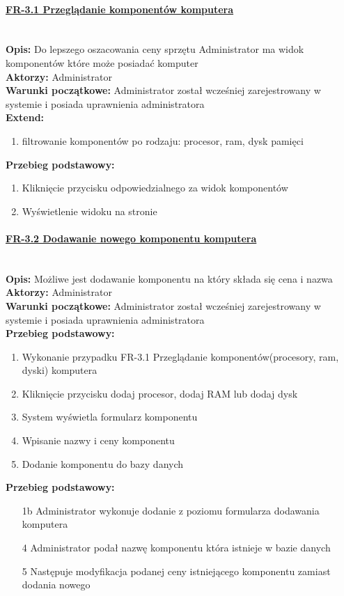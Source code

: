 \paragraph{\underline{FR-3.1 Przeglądanie komponentów komputera}}\mbox{}\\[1mm]
	\noindent\textbf{Opis:} Do lepszego oszacowania ceny sprzętu Administrator ma widok komponentów które może posiadać komputer\\
	\noindent\textbf{Aktorzy:} Administrator\\
	\textbf{Warunki początkowe:} Administrator został wcześniej zarejestrowany w systemie i posiada uprawnienia administratora\\
	\textbf{Extend:}
    \begin{enumerate}[noparskip]
		\item filtrowanie komponentów po rodzaju: procesor, ram, dysk pamięci
	\end{enumerate}
    \textbf{Przebieg podstawowy:}
	\begin{enumerate}[noparskip]
		\item Kliknięcie przycisku odpowiedzialnego za widok komponentów
		\item Wyświetlenie widoku na stronie
    \end{enumerate}

\paragraph{\underline{FR-3.2 Dodawanie nowego komponentu komputera}}\mbox{}\\[1mm]
	\noindent\textbf{Opis:} Możliwe jest dodawanie komponentu na który składa się cena i nazwa\\
	\noindent\textbf{Aktorzy:} Administrator\\
	\textbf{Warunki początkowe:} Administrator został wcześniej zarejestrowany w systemie i posiada uprawnienia administratora\\
    \textbf{Przebieg podstawowy:}
    \begin{enumerate}[noparskip]
		\item Wykonanie przypadku FR-3.1 Przeglądanie komponentów(procesory, ram, dyski) komputera
        \item Kliknięcie przycisku dodaj procesor, dodaj RAM lub dodaj dysk
		\item System wyświetla formularz komponentu
		\item Wpisanie nazwy i ceny komponentu
		\item Dodanie komponentu do bazy danych
    \end{enumerate}
    \textbf{Przebieg podstawowy:}
    \begin{enumerate}[noparskip]
		\item[1b] Administrator wykonuje dodanie z poziomu formularza dodawania komputera
		\item[4] Administrator podał nazwę komponentu która istnieje w bazie danych
		\item[5] Następuje modyfikacja podanej ceny istniejącego komponentu zamiast dodania nowego
    \end{enumerate}

